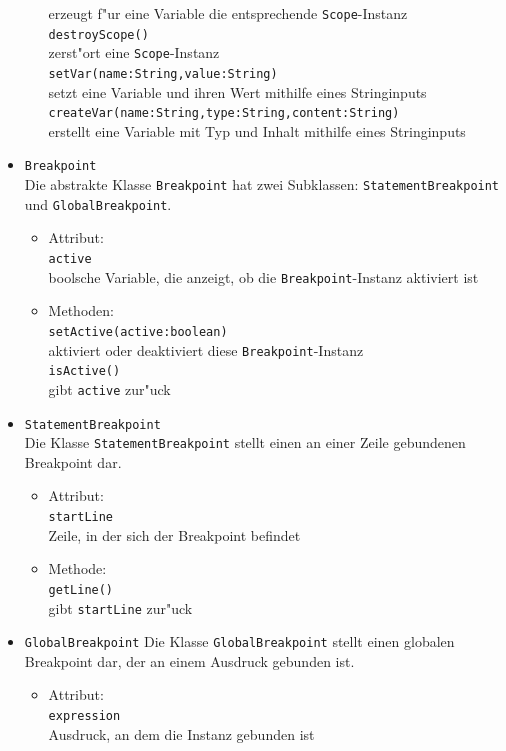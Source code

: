 \documentclass[10pt,a4paper,titlepage]{article}
\begin{document}
\begin{itemize}
\begin{itemize}
erzeugt f"ur eine Variable die entsprechende \texttt{Scope}-Instanz \\
\texttt{destroyScope()} \\
zerst"ort eine \texttt{Scope}-Instanz \\
\texttt{setVar(name:String,value:String)}  \\
setzt eine Variable und ihren Wert mithilfe eines Stringinputs \\
\texttt{createVar(name:String,type:String,content:String)} \\
erstellt eine Variable mit Typ und Inhalt mithilfe eines Stringinputs 
\end{itemize}
\item \texttt{Breakpoint} \\
Die abstrakte Klasse \texttt{Breakpoint} hat zwei Subklassen: \texttt{StatementBreakpoint} und \texttt{GlobalBreakpoint}. 
\begin{itemize}
\item Attribut: \\
\texttt{active} \\
boolsche Variable, die anzeigt, ob die \texttt{Breakpoint}-Instanz aktiviert ist 
\item Methoden: \\
\texttt{setActive(active:boolean)} \\
aktiviert oder deaktiviert diese \texttt{Breakpoint}-Instanz \\
\texttt{isActive()} \\
gibt \texttt{active} zur"uck
\end{itemize}
\item \texttt{StatementBreakpoint} \\
Die Klasse \texttt{StatementBreakpoint} stellt einen an einer Zeile gebundenen Breakpoint dar. 
\begin{itemize}
\item Attribut: \\
\texttt{startLine} \\
Zeile, in der sich der Breakpoint befindet
\item Methode: \\
\texttt{getLine()} \\
gibt \texttt{startLine} zur"uck
\end{itemize}
\item \texttt{GlobalBreakpoint}
Die Klasse \texttt{GlobalBreakpoint} stellt einen globalen Breakpoint dar, der an einem Ausdruck gebunden ist. 
\begin{itemize}
\item Attribut: \\
\texttt{expression} \\
Ausdruck, an dem die Instanz gebunden ist \\
\end{itemize}
\end{itemize}
\end{document}
